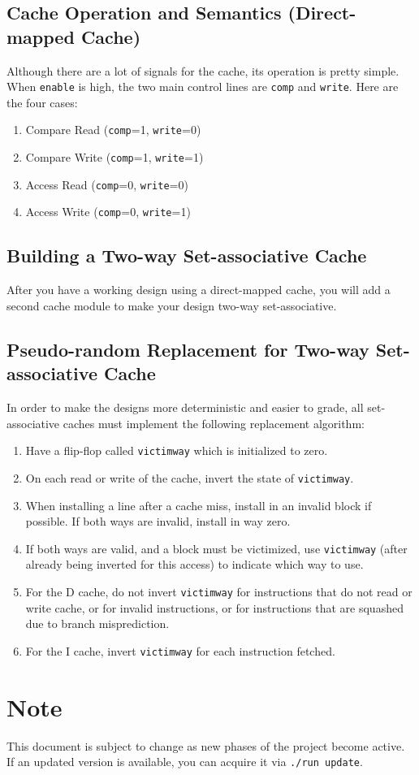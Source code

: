 \documentclass[11pt]{article}
\begin{document}
\subsection{Cache Operation and Semantics (Direct-mapped Cache)}
Although there are a lot of signals for the cache, its operation is pretty simple. When \texttt{enable} is high, the two main control lines are \texttt{comp} and \texttt{write}. Here are the four cases:
\begin{enumerate}
\item Compare Read (\texttt{comp}=1, \texttt{write}=0)
\item Compare Write (\texttt{comp}=1, \texttt{write}=1)
\item Access Read (\texttt{comp}=0, \texttt{write}=0)
\item Access Write (\texttt{comp}=0, \texttt{write}=1)
\end{enumerate}

\subsection{Building a Two-way Set-associative Cache}
After you have a working design using a direct-mapped cache, you will add a second cache module to make your design two-way set-associative.

\subsection{Pseudo-random Replacement for Two-way Set-associative Cache}
In order to make the designs more deterministic and easier to grade, all set-associative caches must implement the following replacement algorithm:
\begin{enumerate}
\item Have a flip-flop called \texttt{victimway} which is initialized to zero.
\item On each read or write of the cache, invert the state of \texttt{victimway}.
\item When installing a line after a cache miss, install in an invalid block if possible. If both ways are invalid, install in way zero.
\item If both ways are valid, and a block must be victimized, use \texttt{victimway} (after already being inverted for this access) to indicate which way to use.
\item For the D cache, do not invert \texttt{victimway} for instructions that do not read or write cache, or for invalid instructions, or for instructions that are squashed due to branch misprediction.
\item For the I cache, invert \texttt{victimway} for each instruction fetched.
\end{enumerate}


\clearpage
\section*{Note}
This document is subject to change as new phases of the project become active. If an updated version is available, you can acquire it via \texttt{./run update}.
\end{document}
